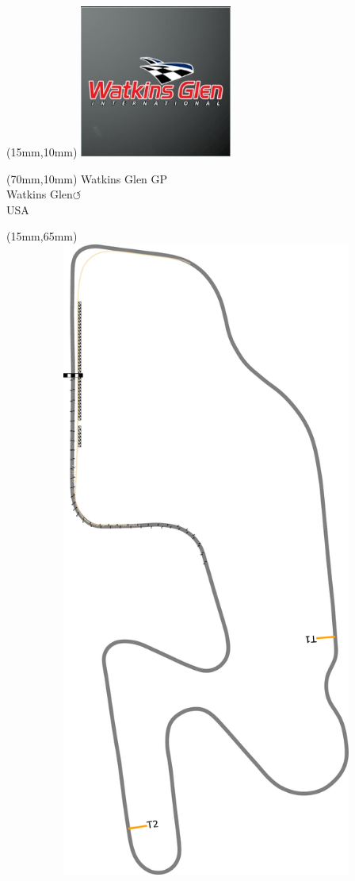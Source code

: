 \null\newpage
\begin{textblock*}{50mm}(15mm,10mm)%
\includegraphics[width=50mm]{LG/2015-05-20_00097.png}
\end{textblock*}
\begin{textblock*}{130mm}(70mm,10mm)%
{\fontsize{20}{20}\selectfont Watkins Glen GP\\}
{\fontsize{16}{16}\selectfont Watkins Glen\hfill \huge$\circlearrowleft$\\}
{\fontsize{12}{12}\selectfont USA\\}
\end{textblock*}
\begin{textblock*}{185mm}(15mm,65mm)%
\centering
\mbox{\includegraphics[width=185mm,height=210mm,keepaspectratio]{PT/WAGLGP.pdf}}
\end{textblock*}
